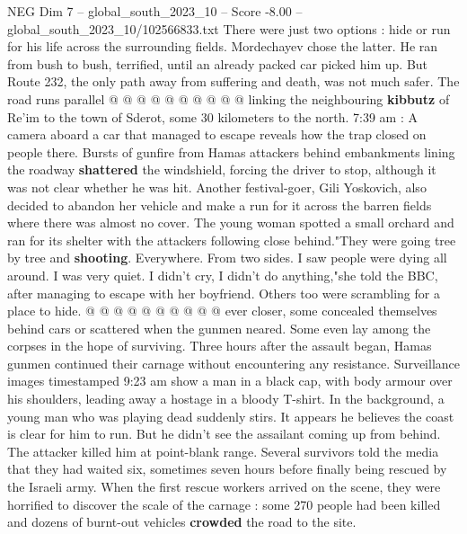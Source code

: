 \begin{textsample}{NEG Dim 7 – global\_south\_2023\_10 – Score -8.00 – global\_south\_2023\_10/102566833.txt}
There were just two options : hide or run for his life across the surrounding fields.
Mordechayev chose the latter.
He ran from bush to bush, terrified, until an already packed car picked him up.
But Route 232, the only path away from suffering and death, was not much safer.
The road runs parallel @ @ @ @ @ @ @ @ @ @ linking the neighbouring \textbf{kibbutz} of Re'im to the town of Sderot, some 30 kilometers to the north. 7:39 am : A camera aboard a car that managed to escape reveals how the trap closed on people there.
Bursts of gunfire from Hamas attackers behind embankments lining the roadway \textbf{shattered} the windshield, forcing the driver to stop, although it was not clear whether he was hit.
Another festival-goer, Gili Yoskovich, also decided to abandon her vehicle and make a run for it across the barren fields where there was almost no cover.
The young woman spotted a small orchard and ran for its shelter with the attackers following close behind."They were going tree by tree and \textbf{shooting}.
Everywhere.
From two sides.
I saw people were dying all around.
I was very quiet.
I didn't cry, I didn't do anything,"she told the BBC, after managing to escape with her boyfriend.
Others too were scrambling for a place to hide. @ @ @ @ @ @ @ @ @ @ ever closer, some concealed themselves behind cars or scattered when the gunmen neared.
Some even lay among the corpses in the hope of surviving.
Three hours after the assault began, Hamas gunmen continued their carnage without encountering any resistance.
Surveillance images timestamped 9:23 am show a man in a black cap, with body armour over his shoulders, leading away a hostage in a bloody T-shirt.
In the background, a young man who was playing dead suddenly stirs.
It appears he believes the coast is clear for him to run.
But he didn't see the assailant coming up from behind.
The attacker killed him at point-blank range.
Several survivors told the media that they had waited six, sometimes seven hours before finally being rescued by the Israeli army.
When the first rescue workers arrived on the scene, they were horrified to discover the scale of the carnage : some 270 people had been killed and dozens of burnt-out vehicles \textbf{crowded} the road to the site.

\end{textsample}
